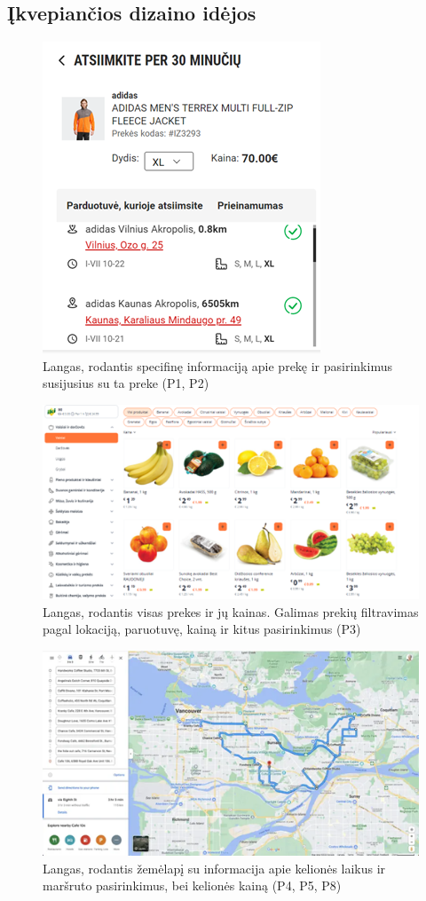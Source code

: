 \documentclass{article}
\begin{document}
\subsection{Įkvepiančios dizaino idėjos}
	\centering
	\begin{figure}[H]
		\includegraphics{./images/Picture1.png}
		\caption{Langas, rodantis specifinę informaciją apie prekę ir pasirinkimus susijusius su ta preke (P1, P2)}
		\label{Pav:picture1}
	\end{figure}
	\begin{figure}[H]
		\includegraphics{./images/Picture2.png}
		\caption{Langas, rodantis visas prekes ir jų kainas. Galimas prekių filtravimas pagal lokaciją, paruotuvę, kainą ir kitus pasirinkimus (P3)}
		\label{Pav:picture2}
	\end{figure}
	\begin{figure}[H]
	\includegraphics{./images/Picture3.png}
		\caption{Langas, rodantis žemėlapį su informacija apie kelionės laikus ir maršruto pasirinkimus, bei kelionės kainą (P4, P5, P8)}
		\label{Pav:picture3}
	\end{figure}
\end{document}
